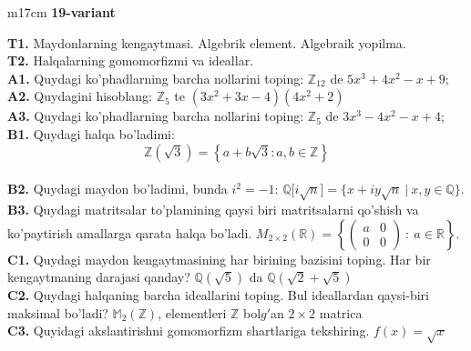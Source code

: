 \documentclass{article}
\begin{document}
\begin{tabular}{m{17cm}}
\textbf{19-variant}
\newline

\textbf{T1.} Maydonlarning kengaytmasi. Algebrik element. Algebraik yopilma. \\
\textbf{T2.} Halqalarning gomomorfizmi va ideallar. \\
\textbf{A1.} Quydagi ko'phadlarning barcha nollarini toping:
\(\mathbb{Z}_{12}\) de \(5x^{3} + 4x^{2} - x + 9\); \\
\textbf{A2.} Quydagini hisoblang:
\(\mathbb{Z}_{5}\) te \(\left( 3x^{2} + 3x - 4 \right)\left( 4x^{2} + 2 \right)\) \\
\textbf{A3.} Quydagi ko'phadlarning barcha nollarini toping:
\(\mathbb{Z}_{5}\) de \(3x^{3} - 4x^{2} - x + 4\); \\
\textbf{B1.} Quydagi halqa bo'ladimi:
\[\mathbb{Z}\left( \sqrt{3} \right) = \left\{ a + b\sqrt{3}:a,b \in \mathbb{Z} \right\}\] \\
\textbf{B2.} Quydagi maydon bo'ladimi, bunda \(i^{2} = - 1\):
\(\mathbb{Q\lbrack}i\sqrt{n}\rbrack = \{ x + iy\sqrt{n}\ |\ x,y \in \mathbb{Q\}}\). \\
\textbf{B3.} Quydagi matritsalar to'plamining qaysi biri matritsalarni qo'shish va ko'paytirish amallarga qarata halqa bo'ladi.
\(M_{2 \times 2}\mathbb{(R) =}\left\{ \begin{pmatrix}
a & 0 \\
0 & 0
\end{pmatrix}\ :\ a \in \mathbb{R} \right\}\). \\
\textbf{C1.} Quydagi maydon kengaytmasining har birining bazisini toping. Har bir kengaytmaning darajasi qanday?
\(\mathbb{Q}\left( \sqrt{5} \right)\) da \(\mathbb{Q}\left( \sqrt{2} + \sqrt{5} \right)\) \\
\textbf{C2.} Quydagi halqaning barcha ideallarini toping. Bul ideallardan qaysi-biri maksimal bo'ladi?
\(\mathbb{M}_{2}\left( \mathbb{Z} \right)\), elementleri \(\mathbb{Z}\) bol\(g'\)an \(2 \times 2\) matrica \\
\textbf{C3.} Quyidagi akslantirishni gomomorfizm shartlariga tekshiring. \(f(x) = \sqrt{x}\) \\

\end{tabular}
\vspace{1cm}
\end{document}
